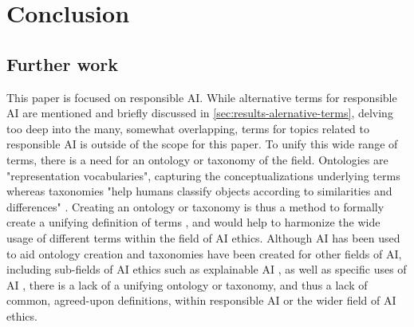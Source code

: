 \section{Conclusion}
\label{sec:Conclusion}


\subsection{Further work}
This paper is focused on responsible AI. While alternative terms for responsible AI are mentioned and briefly discussed in \autoref{sec:results-alernative-terms}, delving too deep into the many, somewhat overlapping, terms for topics related to responsible AI is outside of the scope for this paper. To unify this wide range of terms, there is a need for an ontology or 
taxonomy of the field. Ontologies are "representation vocabularies", capturing the conceptualizations underlying terms \parencite{Chandrasekaran_1999} whereas taxonomies "help humans classify objects according to similarities and differences" \parencite{Kundisch_2022}. Creating an ontology or taxonomy is thus a method to formally create a unifying definition of terms \parencite{Uschold_1996}, and would help to harmonize the wide usage of different terms within the field of AI ethics. Although AI has been used to aid ontology creation \parencite{Stumme_2001} and taxonomies have been created for other fields of AI, including sub-fields of AI ethics such as explainable AI \parencite{BarredoArrieta_2020}, as well as specific uses of AI \parencite{Gunn_2009,Ören_1994,Fong_2003}, there is a lack of a unifying ontology or taxonomy, and thus a lack of common, agreed-upon definitions, within responsible AI or the wider field of AI ethics. %



